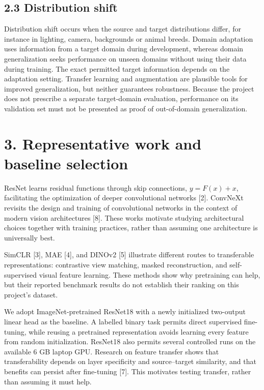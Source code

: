 \documentclass[
  10pt,
  a4paper,
]{article}
\begin{document}
\subsection{2.3 Distribution shift}\label{distribution-shift}

Distribution shift occurs when the source and target distributions
differ, for instance in lighting, camera, backgrounds or animal breeds.
Domain adaptation uses information from a target domain during
development, whereas domain generalization seeks performance on unseen
domains without using their data during training. The exact permitted
target information depends on the adaptation setting. Transfer learning
and augmentation are plausible tools for improved generalization, but
neither guarantees robustness. Because the project does not prescribe a
separate target-domain evaluation, performance on its validation set
must not be presented as proof of out-of-domain generalization.

\section{3. Representative work and baseline
selection}\label{representative-work-and-baseline-selection}

ResNet learns residual functions through skip connections, \(y=F(x)+x\),
facilitating the optimization of deeper convolutional networks {[}2{]}.
ConvNeXt revisits the design and training of convolutional networks in
the context of modern vision architectures {[}8{]}. These works motivate
studying architectural choices together with training practices, rather
than assuming one architecture is universally best.

SimCLR {[}3{]}, MAE {[}4{]}, and DINOv2 {[}5{]} illustrate different
routes to transferable representations: contrastive view matching,
masked reconstruction, and self-supervised visual feature learning.
These methods show why pretraining can help, but their reported
benchmark results do not establish their ranking on this project's
dataset.

We adopt ImageNet-pretrained ResNet18 with a newly initialized
two-output linear head as the baseline. A labelled binary task permits
direct supervised fine-tuning, while reusing a pretrained representation
avoids learning every feature from random initialization. ResNet18 also
permits several controlled runs on the available 6 GB laptop GPU.
Research on feature transfer shows that transferability depends on layer
specificity and source--target similarity, and that benefits can persist
after fine-tuning {[}7{]}. This motivates testing transfer, rather than
assuming it must help.
\end{document}
